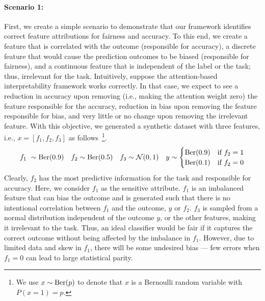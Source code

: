 \paragraph{Scenario 1:} First, we create a simple scenario to demonstrate that our framework identifies correct feature attributions for fairness and accuracy. To this end, we create a feature that is correlated with the outcome (responsible for accuracy), a discrete feature that would cause the prediction outcomes to be biased (responsible for fairness), and a continuous feature that is independent of the label or the task; thus, irrelevant for the task. Intuitively, suppose the attention-based interpretability framework works correctly. In that case, we expect to see a reduction in accuracy upon removing (i.e., making the attention weight zero) the feature responsible  for the accuracy, reduction in bias upon removing the feature responsible for bias, and very little or no change upon removing the irrelevant feature. With this objective, we generated a synthetic dataset with three features, i.e., $x = [f_1, f_2, f_3]$ as follows~\footnote{We use $x\sim \text{Ber}(p)$ to denote that $x$  is a Bernoulli random variable with $P(x=1)=p$.}.
\begin{equation*}
    f_1 ~\sim \text{Ber}(0.9)
    \quad f_2\sim \text{Ber}(0.5)
    \quad f_3\sim \mathcal N (0,1)
    \quad y\sim \begin{cases}
        \text{Ber}(0.9) & \text{if } f_2=1\\
        \text{Ber}(0.1) & \text{if } f_2=0
    \end{cases}
\end{equation*}
%
Clearly, $f_2$ has the most predictive information for the task and responsible for accuracy. Here, we consider $f_1$ as the sensitive attribute. $f_1$ is an imbalanced feature that can bias the outcome and is generated such that there is no intentional correlation between $f_1$ and the outcome, $y$ or $f_2$. $f_3$ is sampled from a normal distribution independent of the outcome $y$, or the other features, making it  irrelevant to the task.
Thus, an ideal classifier would be fair if it captures the correct outcome without being affected by the imbalance in $f_1$. However, due to limited data and skew in $f_1$,  there will be some undesired bias --- few errors when $f_1=0$ can lead to large statistical parity. 

